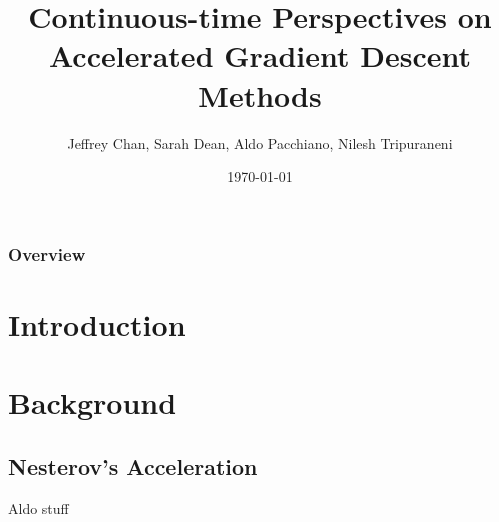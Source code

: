 \documentclass{beamer}
\title[]{Continuous-time Perspectives on Accelerated Gradient Descent Methods} %
\author[Chan, Dean, Pacchiano, Tripuraneni]{Jeffrey Chan, Sarah Dean, Aldo Pacchiano, Nilesh Tripuraneni} %
\institute[UCB] %
{Department of EECS,
University of California, Berkeley }
\date{\today} %
\begin{document}
\begin{frame}
\titlepage %
\end{frame}

\begin{frame}
\frametitle{Overview} %
\tableofcontents %
\end{frame}


\section{Introduction} %

\section{Background}

\subsection{Nesterov's Acceleration}
Aldo stuff
\end{document}
